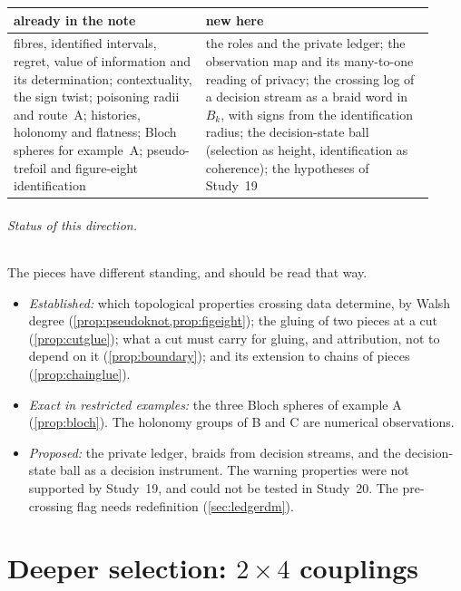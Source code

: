 \documentclass[11pt]{article}
\theoremstyle{definition}\newtheorem{definition}[theorem]{Definition}\newtheorem{remark}[theorem]{Remark}\newtheorem{example}[theorem]{Example}\newtheorem{problem}[theorem]{Open problem}\crefname{problem}{Problem}{Problems}
\begin{document}
\begin{center}\small
\begin{tabular}{p{0.42\linewidth}p{0.5\linewidth}}
\toprule
already in the note & new here\\\midrule
fibres, identified intervals, regret, value of information and its determination; contextuality, the sign twist; poisoning radii and route~A; histories, holonomy and flatness; Bloch spheres for example~A; pseudo-trefoil and figure-eight identification & the roles and the private ledger; the observation map and its many-to-one reading of privacy; the crossing log of a decision stream as a braid word in $B_k$, with signs from the identification radius; the decision-state ball (selection as height, identification as coherence); the hypotheses of Study~19\\
\bottomrule
\end{tabular}
\end{center}

\paragraph{Status of this direction.} The pieces have different standing, and should be read that way.
\begin{itemize}
\item \emph{Established:} which topological properties crossing data determine, by Walsh degree (\cref{prop:pseudoknot,prop:figeight}); the gluing of two pieces at a cut (\cref{prop:cutglue}); what a cut must carry for gluing, and attribution, not to depend on it (\cref{prop:boundary}); and its extension to chains of pieces (\cref{prop:chainglue}).
\item \emph{Exact in restricted examples:} the three Bloch spheres of example A (\cref{prop:bloch}). The holonomy groups of B and C are numerical observations.
\item \emph{Proposed:} the private ledger, braids from decision streams, and the decision-state ball as a decision instrument. The warning properties were not supported by Study~19, and could not be tested in Study~20. The pre-crossing flag needs redefinition (\cref{sec:ledgerdm}).
\end{itemize}

\part{Deeper selection: \texorpdfstring{$2\times4$}{2 x 4} couplings}
\end{document}
